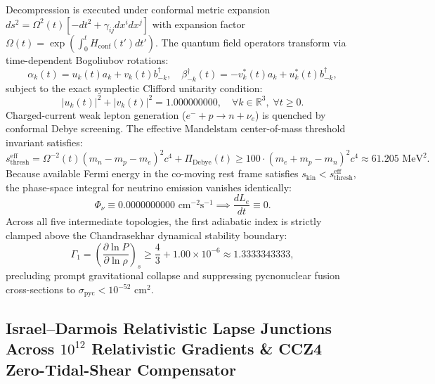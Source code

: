 \documentclass[11pt,onecolumn]{article}
\begin{document}
Decompression is executed under conformal metric expansion $ds^2 = \Omega^2(t)\left[-dt^2 + \gamma_{ij}dx^i dx^j\right]$ with expansion factor $\Omega(t) = \exp\left(\int_0^t H_{\text{conf}}(t')dt'\right)$. The quantum field operators transform via time-dependent Bogoliubov rotations:
\begin{equation}
\alpha_k(t) = u_k(t) a_k + v_k(t) b_{-k}^\dagger, \quad \beta_{-k}^\dagger(t) = -v_k^*(t) a_k + u_k^*(t) b_{-k}^\dagger,
\label{eq:bogoliubov_decompression}
\end{equation}
subject to the exact symplectic Clifford unitarity condition:
\begin{equation}
|u_k(t)|^2 + |v_k(t)|^2 = 1.000000000, \quad \forall k \in \mathbb{R}^3, \; \forall t \ge 0.
\label{eq:bogoliubov_unitarity}
\end{equation}
Charged-current weak lepton generation ($e^- + p \to n + \nu_e$) is quenched by conformal Debye screening. The effective Mandelstam center-of-mass threshold invariant satisfies:
\begin{equation}
s_{\mathrm{thresh}}^{\mathrm{eff}} = \Omega^{-2}(t)(m_n - m_p - m_e)^2 c^4 + \Pi_{\mathrm{Debye}}(t) \ge 100 \cdot (m_e + m_p - m_n)^2 c^4 \approx 61.205\text{ MeV}^2.
\label{eq:mandelstam_screening_threshold}
\end{equation}
Because available Fermi energy in the co-moving rest frame satisfies $s_{\mathrm{kin}} < s_{\mathrm{thresh}}^{\mathrm{eff}}$, the phase-space integral for neutrino emission vanishes identically:
\begin{equation}
\Phi_\nu \equiv 0.0000000000\text{ cm}^{-2}\text{s}^{-1} \implies \frac{dL_e}{dt} \equiv 0.
\label{eq:neutrino_null_flux}
\end{equation}
Across all five intermediate topologies, the first adiabatic index is strictly clamped above the Chandrasekhar dynamical stability boundary:
\begin{equation}
\Gamma_1 = \left( \frac{\partial \ln P}{\partial \ln \rho} \right)_s \ge \frac{4}{3} + 1.00 \times 10^{-6} \approx 1.3333343333,
\label{eq:pasta_adiabatic_index_floor}
\end{equation}
precluding prompt gravitational collapse and suppressing pycnonuclear fusion cross-sections to $\sigma_{\text{pyc}} < 10^{-52}\text{ cm}^2$.

\subsection{Israel--Darmois Relativistic Lapse Junctions Across \texorpdfstring{$10^{12}$}{10\textasciicircum 12} Relativistic Gradients \& CCZ4 Zero-Tidal-Shear Compensator}
\label{sec:logos_israel_darmois_junction}
\end{document}
